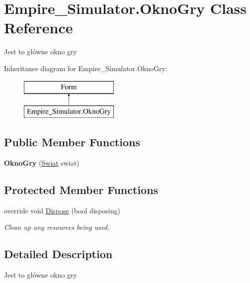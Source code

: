 \hypertarget{class_empire___simulator_1_1_okno_gry}{\section{Empire\+\_\+\+Simulator.\+Okno\+Gry Class Reference}
\label{class_empire___simulator_1_1_okno_gry}
}


Jest to główne okno gry  


Inheritance diagram for Empire\+\_\+\+Simulator.\+Okno\+Gry\+:\begin{figure}[H]
\begin{center}
\leavevmode
\includegraphics[height=2.000000cm]{class_empire___simulator_1_1_okno_gry}
\end{center}
\end{figure}
\subsection*{Public Member Functions}
\begin{DoxyCompactItemize}
\item 
\hypertarget{class_empire___simulator_1_1_okno_gry_a7aa35cd006097d16c37de5ad5be7e8cd}{{\bfseries Okno\+Gry} (\hyperlink{class_empire___simulator_1_1_swiat}{Swiat} swiat)}\label{class_empire___simulator_1_1_okno_gry_a7aa35cd006097d16c37de5ad5be7e8cd}

\end{DoxyCompactItemize}
\subsection*{Protected Member Functions}
\begin{DoxyCompactItemize}
\item 
override void \hyperlink{class_empire___simulator_1_1_okno_gry_aa5626b7864ef1f2465646b0305b10431}{Dispose} (bool disposing)
\begin{DoxyCompactList}\small\item\em Clean up any resources being used. \end{DoxyCompactList}\end{DoxyCompactItemize}


\subsection{Detailed Description}
Jest to główne okno gry 



